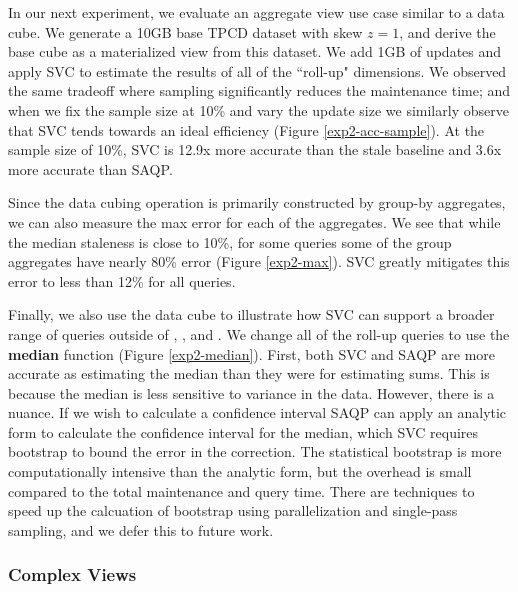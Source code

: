 In our next experiment, we evaluate an aggregate view use case similar to a data cube.
We generate a 10GB base TPCD dataset with skew $z=1$, and derive the base cube as a materialized view from this dataset.
We add 1GB of updates and apply SVC to estimate the results of all of the ``roll-up" dimensions.
We observed the same tradeoff where sampling significantly reduces the maintenance time; and when we fix the sample size at 10\%
and vary the update size we similarly observe that SVC tends towards an ideal efficiency (Figure \ref{exp2-acc-sample}).
At the sample size of 10\%, SVC is 12.9x more accurate than the stale baseline and 3.6x more accurate than SAQP.

Since the data cubing operation is primarily constructed by group-by aggregates, we can also measure the max error for each of the aggregates.
We see that while the median staleness is close to 10\%, for some queries some of the group aggregates have nearly 80\% error (Figure \ref{exp2-max}).
SVC greatly mitigates this error to less than 12\% for all queries.

Finally, we also use the data cube to illustrate how SVC can support a broader range of queries outside of \sumfunc, \countfunc, and \avgfunc.
We change all of the roll-up queries to use the \textbf{median} function (Figure \ref{exp2-median}).
First, both SVC and SAQP are more accurate as estimating the median than they were for estimating sums. 
This is because the median is less sensitive to variance in the data.
However, there is a nuance.
If we wish to calculate a confidence interval SAQP can apply an analytic form to calculate the confidence interval for the median, which SVC requires bootstrap to bound the error in the correction.
The statistical bootstrap is more computationally intensive than the analytic form, but the overhead is small compared to the total maintenance and query time.
There are techniques to speed up the calcuation of bootstrap using parallelization and single-pass sampling, and we defer this to future work.

\subsubsection{Complex Views}

